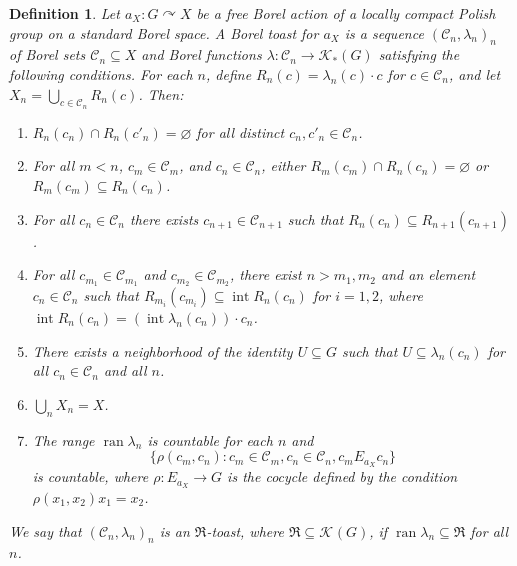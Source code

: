 \documentclass[10pt,a4paper]{amsart}
\newtheorem{definition}{Definition}
\newcommand{\acts}{\curvearrowright}
\DeclareMathOperator{\inter}{\mathrm{int}}
\newcommand{\mfR}{\mathfrak{R}}
\DeclareMathOperator{\ran}{\mathrm{ran}}
\newcommand{\vietoris}[2][]{\mathcal{K}_{#1}(#2)}
\begin{document}
\begin{definition}
  \label{def:toast}
  Let \(a_{X} : G \acts X\) be a free Borel action of a locally compact Polish group on a standard
  Borel space. A Borel \emph{toast} for \(a_{X}\) is a sequence
  \((\mathcal{C}_{n}, \lambda_{n})_{n}\) of Borel sets \(\mathcal{C}_{n} \subseteq X\) and Borel
  functions \(\lambda : \mathcal{C}_{n} \to \vietoris[*]{G}\) satisfying the following
  conditions. For each \(n\), define \(R_{n}(c) = \lambda_{n}(c)\cdot c\) for
  \(c \in \mathcal{C}_{n}\), and let \(X_{n} = \bigcup_{c \in \mathcal{C}_{n}} R_{n}(c)\). Then:
  \begin{enumerate}[leftmargin=1cm, label={\sf \arabic*}., ref={\sf \arabic*}]
  \item\label{item:toast-disjoint} \(R_{n}(c_{n}) \cap R_{n}(c'_{n}) = \varnothing\) for all
    distinct \(c_{n}, c'_{n} \in \mathcal{C}_{n}\).
  \item\label{item:toast-coherent} For all \(m < n\), \(c_{m} \in \mathcal{C}_{m}\), and
    \(c_{n} \in \mathcal{C}_{n}\), either \(R_{m}(c_{m}) \cap R_{n}(c_{n}) = \varnothing\) or
    \(R_{m}(c_{m}) \subseteq R_{n}(c_{n})\).
  \item\label{item:toast-layered} For all \(c_{n} \in \mathcal{C}_{n}\) there exists
    \(c_{n+1} \in \mathcal{C}_{n+1}\) such that \(R_{n}(c_{n}) \subseteq R_{n+1}(c_{n+1})\).
  \item\label{item:toast-directed} For all \(c_{m_{1}} \in \mathcal{C}_{m_{1}}\) and
    \(c_{m_{2}} \in \mathcal{C}_{m_{2}}\), there exist \(n > m_{1}, m_{2}\) and an element
    \(c_{n} \in \mathcal{C}_{n}\) such that \(R_{m_{i}}(c_{m_{i}}) \subseteq \inter R_{n}(c_{n})\)
    for \(i = 1,2\), where \(\inter R_{n}(c_{n}) = (\inter \lambda_{n}(c_{n})) \cdot c_{n}\).
  \item\label{item:lacunary} There exists a neighborhood of the identity \(U \subseteq G\) such that
    \(U \subseteq \lambda_{n}(c_{n})\) for all \(c_{n} \in \mathcal{C}_{n}\) and all \(n\).
  \item\label{item:toast-exhaustive} \(\bigcup_{n} X_{n} = X\).
  \item\label{item:toast-rational} The range \(\ran \lambda_{n}\) is countable for each \(n\) and
    \[\{\rho(c_{m},c_{n}) : c_{m} \in \mathcal{C}_{m}, c_{n} \in \mathcal{C}_{n}, c_{m} E_{a_{X}}
      c_{n}\}\]
    is countable, where \(\rho : E_{a_{X}} \to G\) is the cocycle defined by the condition
    \(\rho(x_{1},x_{2})x_{1} = x_{2}\).
  \end{enumerate}
  We say that \((\mathcal{C}_{n}, \lambda_{n})_{n}\) is an \(\mfR\)-toast, where
  \(\mfR \subseteq \vietoris{G}\), if \(\ran \lambda_{n} \subseteq \mfR\) for all \(n\).
\end{definition}
\end{document}

